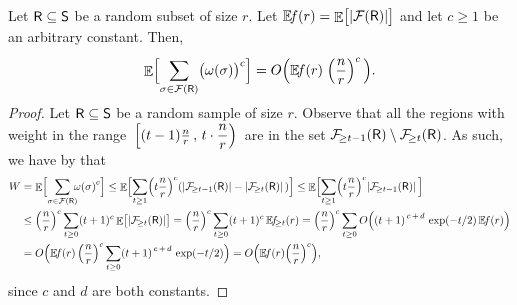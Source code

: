 \begin{theorem}
    Let $\mathsf{R} \subseteq \mathsf{S}$ be a random subset of size
    $r$. Let
    $\NumOfRegionsZero{r} = \Ex{\bigl. |\RegionsSet{\Sample}| }$ and
    let $c \geq 1$ be an arbitrary constant. Then,
    \begin{equation*}
        \biggl.
        \Ex{\Bigl. \smash{ \sum_{\Trap \in \RegionsSet{\Sample}}
              \pth{\bigl.\WeightX{\Trap}}^c}}%
        =%
        O \pth{
           \NumOfRegionsZero{r} \; \pth{\frac{n}{r}}^c\,}.
    \end{equation*}    
\end{theorem}
\smallskip%
\begin{proof}
    Let $\mathsf{R} \subseteq \mathsf{S}$ be a random sample  of size $r$. Observe that all the regions with weight
    in the range $\displaystyle\, \left[(t-1)\tfrac{n}{r} \,, \, t\cdot
        \frac{n}{r} \right)\,$ are in the set
    $\RegionsHeavy{t-1}{\Sample} \setminus \RegionsHeavy{t}{\Sample}
    $. As such, we have by  that
    \begin{align*}
      W
      &=%
        \Ex{\Bigl.\smash{\sum_{\Trap \in \RegionsSet{\Sample}}\!\!\! \WeightX{\Trap}^c }}%
        \leq%
        \Ex{\Bigl. \smash{ \sum_{t \ge 1} \pth{ t \frac{n}{r} }^c \pth{
        \cardin{\RegionsHeavy{t-1}{\Sample}} -
        \cardin{\RegionsHeavy{t}{\Sample} }\, } }}%
        \leq%
        \Ex{\Bigl. \smash{ \sum_{t \ge 1} \pth{ t \frac{n}{r} }^c {\MakeSBig
        \cardin{\RegionsHeavy{t-1}{\Sample}} }\, }}
      \\[2ex]
      &
        \leq%
        \pth{\frac{n}{r} }^{c} \sum_{t \ge 0} (t+1)^c 
        \Ex{\bigl. \cardin{\RegionsHeavy{t}{\Sample} } }
        =%
        \pth{ \frac{n}{r} }^c \sum_{t \ge 0} (t+1)^c \,
        \NumOfRegions{t}{r}%
        =%
        \pth{ \frac{n}{r} }^c \sum_{t \ge 0}
        O\pth{ \pth{t+1}^{\,c \, + \,d} \, \exp(-t/2) \,
        \NumOfRegionsZero{ r } }
      \\&
      =%
      O\Bigl( \NumOfRegionsZero{r } \, \pth{ \frac{n}{r} }^c
      \sum_{t \ge 0} \pth{t+1}^{\,c\,+\,d} \, \exp(-t/2)
      \Bigr)%
      =%
      O \pth{ \NumOfRegionsZero{r } 
      \pth{{\frac{n}{r}} }^c },
    \end{align*}
    since $c$ and $d$ are both constants.
\end{proof}


